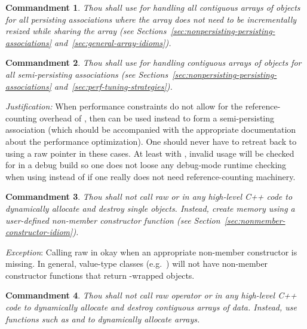 \documentclass[pdf,ps2pdf,11pt]{SANDreport}
\newtheorem{commandment}{Commandment}
\begin{document}
\begin{commandment}
Thou shall use {} for handling all contiguous arrays of
objects for all persisting associations where the array does not need
to be incrementally resized while sharing the array (see
Sections~\ref{sec:nonpersisting-persisting-associations}
and~\ref{sec:general-array-idioms}).
\end{commandment}

\begin{commandment}\label{cmnd:arrayview-semi-persisting}
Thou shall use {} for handling contiguous arrays of
objects for all semi-persisting associations (see
Sections~\ref{sec:nonpersisting-persisting-associations}
and~\ref{sec:perf-tuning-strategies}).
\end{commandment}

{}\textit{Justification:} When performance constraints do not allow
for the reference-counting overhead of {}, then
{} can be used instead to form a semi-persisting
association (which should be accompanied with the appropriate
documentation about the performance optimization).  One should never
have to retreat back to using a raw pointer in these cases.  At least
with {}, invalid usage will be checked for in a debug
build so one does not loose any debug-mode runtime checking when using
{} instead of {} if one really does not
need reference-counting machinery.

\begin{commandment}
Thou shall not call raw {} or {} in any
high-level C++ code to dynamically allocate and destroy single
objects.  Instead, create memory using a user-defined non-member
constructor function (see Section~\ref{sec:nonmember-constructor-idiom}).
\end{commandment}

{}\textit{Exception}: Calling raw {} in okay when an
appropriate non-member constructor is missing.  In general, value-type
classes (e.g.\ {}) will not have non-member
constructor functions that return {}-wrapped objects.

\begin{commandment}
Thou shall not call raw operator {} or {}
in any high-level C++ code to dynamically allocate and destroy
contiguous arrays of data.  Instead, use functions such as
{} and {} to
dynamically allocate arrays.
\end{commandment}
\end{document}
